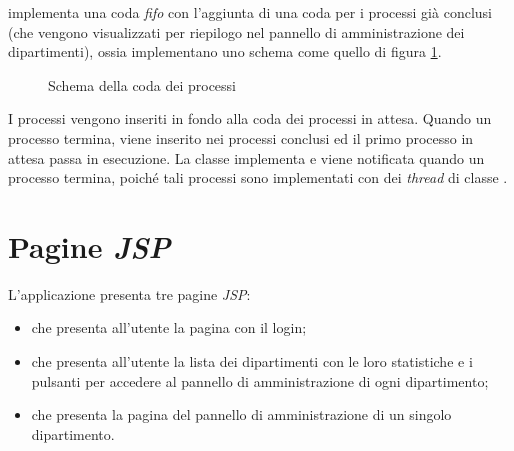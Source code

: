 \documentclass[tesi.tex]{subfiles}
\begin{document}
 implementa una coda \emph{fifo} con l'aggiunta di
una coda per i processi gi\`a conclusi (che vengono visualizzati per
riepilogo nel pannello di amministrazione dei dipartimenti), ossia
implementano uno schema come quello di figura \ref{fig:codaprocessi}.
\begin{figure}
  \begin{center}
  \end{center}
  \caption{Schema della coda dei processi}
  \label{fig:codaprocessi}
\end{figure}
I processi vengono inseriti in fondo alla coda dei processi in attesa. Quando
un processo termina, viene inserito nei processi conclusi ed il primo
processo in attesa passa in esecuzione. La
classe  implementa  e viene
notificata quando un processo termina, poich\'e tali processi sono
implementati con dei \emph{thread} di classe
.

\section{Pagine \emph{JSP}}\label{sec:paginejsp}
L'applicazione presenta tre pagine \emph{JSP}:
\begin{itemize}
\item {} che presenta all'utente la pagina con il login;
\item {} che presenta all'utente la lista dei
  dipartimenti con le loro statistiche e i pulsanti per accedere al
  pannello di amministrazione di ogni dipartimento;
\item {} che presenta la pagina del pannello di
  amministrazione di un singolo dipartimento.
\end{itemize}
\end{document}
